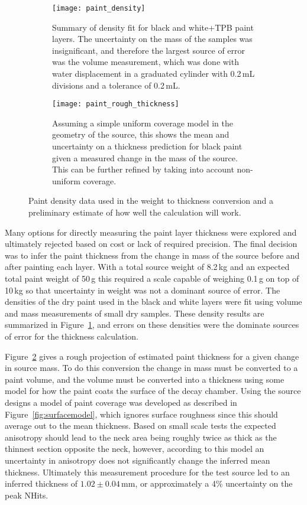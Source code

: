 \begin{figure}[h!]
\begin{subfigure}{.45\textwidth}
  \texttt{[image: paint\_density]}
  \caption{Summary of density fit for black and white+TPB paint layers. The uncertainty on the mass of the samples was insignificant, and therefore the largest source of error was the volume measurement, which was done with water displacement in a graduated cylinder with 0.2\,mL divisions and a tolerance of 0.2\,mL.}
  \label{fig:paintdensity}
\end{subfigure}
\hspace{0.5cm}
\begin{subfigure}{.45\textwidth}
  \texttt{[image: paint\_rough\_thickness]}
  \caption{Assuming a simple uniform coverage model in the geometry of the source, this shows the mean and uncertainty on a thickness prediction for black paint given a measured change in the mass of the source. This can be further refined by taking into account non-uniform coverage. }
  \label{fig:paintthickness}
\end{subfigure}
\caption{Paint density data used in the weight to thickness conversion and a preliminary estimate of how well the calculation will work.}
\label{fig:weightmeasure}
\end{figure}

Many options for directly measuring the paint layer thickness were explored and ultimately rejected based on cost or lack of required precision. The final decision was to infer the paint thickness from the change in mass of the source before and after painting each layer. With a total source weight of 8.2\,kg and an expected total paint weight of 50\,g this required a scale capable of weighing 0.1\,g on top of 10\,kg so that uncertainty in weight was not a dominant source of error. The densities of the dry paint used in the black and white layers were fit using volume and mass measurements of small dry samples. These density results are summarized in Figure~\ref{fig:paintdensity}, and errors on these densities were the dominate sources of error for the thickness calculation. 

Figure~\ref{fig:paintthickness} gives a rough projection of estimated paint thickness for a given change in source mass. To do this conversion the change in mass must be converted to a paint volume, and the volume must be converted into a thickness using some model for how the paint coats the surface of the decay chamber. Using the source designs a model of paint coverage was developed as described in Figure~\ref{fig:surfacemodel}, which ignores surface roughness since this should average out to the mean thickness. Based on small scale tests the expected anisotropy should lead to the neck area being roughly twice as thick as the thinnest section opposite the neck, however, according to this model an uncertainty in anisotropy does not significantly change the inferred mean thickness. Ultimately this measurement procedure for the test source led to an inferred thickness of $1.02\pm0.04$\,mm, or approximately a 4\% uncertainty on the peak NHits.

